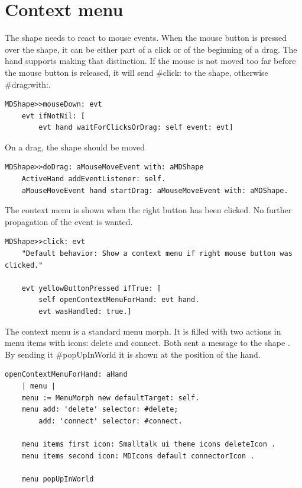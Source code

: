 \documentclass[10pt]{article}   	%
\begin{document}
\section{Context menu}
The shape needs to react to mouse events. When the mouse button is pressed 
over the shape, it can be either part of a click or of the beginning of a drag.
The hand supports making that distinction. If the mouse is not moved too far
before the mouse button is released, it will send \#click: to the shape, otherwise
\#drag:with:.
\begin{verbatim}
MDShape>>mouseDown: evt
    evt ifNotNil: [  
        evt hand waitForClicksOrDrag: self event: evt]
\end{verbatim}
On a drag, the shape should be moved
\begin{verbatim}
MDShape>>doDrag: aMouseMoveEvent with: aMDShape 
    ActiveHand addEventListener: self.
    aMouseMoveEvent hand startDrag: aMouseMoveEvent with: aMDShape.
\end{verbatim}
The context menu is shown when the right button has been clicked.
No further propagation of the event is wanted.
\begin{verbatim}
MDShape>>click: evt
    "Default behavior: Show a context menu if right mouse button was clicked."
	
    evt yellowButtonPressed ifTrue: [
        self openContextMenuForHand: evt hand.
        evt wasHandled: true.]
\end{verbatim}
The context menu is a standard menu morph. It is filled with two
actions in menu items with icons: delete and connect. Both sent a message to the shape . 
By sending it \#popUpInWorld it is shown at the position of the hand. 
\begin{verbatim}
openContextMenuForHand: aHand
    | menu |
    menu := MenuMorph new defaultTarget: self.
    menu add: 'delete' selector: #delete;
        add: 'connect' selector: #connect.

    menu items first icon: Smalltalk ui theme icons deleteIcon .
    menu items second icon: MDIcons default connectorIcon .

    menu popUpInWorld
\end{verbatim}
\end{document}
